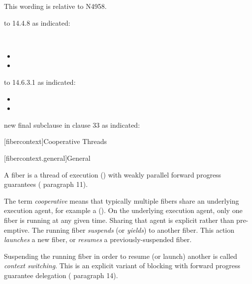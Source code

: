 \newpage
{}\label{api}

This wording is relative to N4958.\cite{Standard}

 to 14.4.8  as indicated:

\\
\begin{itemize}
    \item {}
    \item {}
\end{itemize}

 to 14.6.3.1  as indicated:

\begin{itemize}
    \item {}
    \item {}
\end{itemize}

 new final subclause in clause 33  as indicated:

\setcounter{section}{33}
\setcounter{subsection}{11}
\setcounter{secnumdepth}{5}

[fibercontext]{Cooperative Threads}

[fibercontext.general]{General}

\para A fiber is a thread of execution () with
weakly parallel forward progress guarantees ( paragraph 11).

\para The term \emph{cooperative} means that typically multiple fibers share
an underlying execution agent, for example a 
(). On the underlying execution agent, only one
fiber is running at any given time. Sharing that agent is explicit rather than
pre-emptive. The running fiber \emph{suspends} (or \emph{yields}) to another
fiber. This action \emph{launches} a new fiber, or \emph{resumes} a
previously-suspended fiber.

\para Suspending the running fiber in order to resume (or launch) another is
called \emph{context switching}. This is an explicit variant of blocking with
forward progress guarantee delegation ( paragraph 14).

